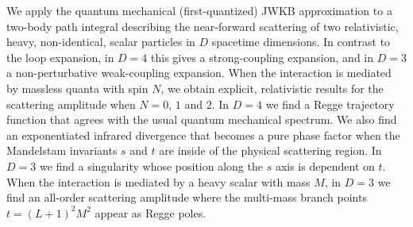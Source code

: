 We apply the quantum mechanical (first-quantized) JWKB approximation to a two-body path integral describing the near-forward scattering of two relativistic, heavy, non-identical, scalar particles in $D$ spacetime dimensions. In contrast to the loop expansion, in $D = 4$ this gives a strong-coupling expansion, and in $D = 3$ a non-perturbative weak-coupling expansion.
When the interaction is mediated by massless quanta with spin $N$, we obtain explicit, relativistic results for the scattering amplitude when $N = 0$, $1$ and $2$. In $D = 4$ we find a Regge trajectory function that agrees with the usual quantum mechanical spectrum. We also find an exponentiated infrared divergence that becomes a pure phase factor when the Mandelstam invariants $s$ and $t$ are inside of the physical scattering region. In $D = 3$ we find a singularity whose position along the $s$ axis is dependent on $t$.
When the interaction is mediated by a heavy scalar with mass $M$, in $D = 3$ we find an all-order scattering amplitude where the multi-mass branch points $t = (L + 1)^{2}M^{2}$ appear as Regge poles.
